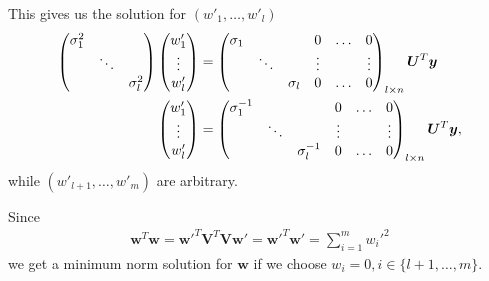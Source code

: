 This gives us the solution for $(w'_{1},\hdots, w'_l)$
\begin{align}    
    \begin{pmatrix}
        \sigma_{1}^2 &        &               \\
                     & \ddots &               \\
                     &        &  \sigma_{l}^2 \\
    \end{pmatrix} 
    \begin{pmatrix}
        w'_1\\
        \vdots \\
        w'_l
    \end{pmatrix} &= 
    \begin{pmatrix}
        \sigma_{1}   &        &               & 0       & \hdots & 0      \\
                     & \ddots &               & \vdots  &        & \vdots \\
                     &        &  \sigma_{l}   & 0       & \hdots & 0      \\                     
    \end{pmatrix}_{l \times n}\bm{U}^T \bm{y} \\
    \begin{pmatrix}
        w'_1\\
        \vdots \\
        w'_l
    \end{pmatrix} &=
    \begin{pmatrix}
        \sigma_{1}^{-1}   &        &               & 0       & \hdots & 0      \\
                     & \ddots &                    & \vdots  &        & \vdots \\
                     &        &  \sigma_{l}^{-1}   & 0       & \hdots & 0      \\                     
    \end{pmatrix}_{l \times n}\bm{U}^T \bm{y}, \\
\end{align}
while $(w'_{l+1},\hdots, w'_m)$ are arbitrary.

Since 
\begin{align}
\bm{w}^T \bm{w} = \bm{w}'^T \bm{V}^T \mathbf{V} \bm{w}'=\bm{w}'^T \bm{w}' = \sum_{i=1}^{m}w_{i}'^2
\end{align}
we get a minimum norm solution for $\bm{w}$ if we choose $w_{i}=0, i \in \{l+1,\hdots, m\}$.
